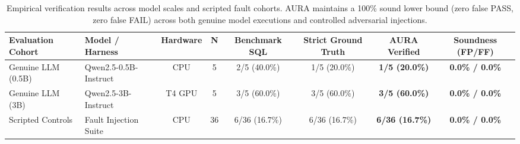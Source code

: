 \begin{table}[t]
\centering
\small
\begin{tabular}{llcccccc}
\toprule
\textbf{Evaluation Cohort} & \textbf{Model / Harness} & \textbf{Hardware} & \textbf{N} & \textbf{Benchmark SQL} & \textbf{Strict Ground Truth} & \textbf{AURA Verified} & \textbf{Soundness (FP/FF)} \\
\midrule
Genuine LLM (0.5B) & Qwen2.5-0.5B-Instruct & CPU & 5 & 2/5 (40.0\%) & 1/5 (20.0\%) & \textbf{1/5 (20.0\%)} & \textbf{0.0\% / 0.0\%} \\
Genuine LLM (3B)   & Qwen2.5-3B-Instruct   & T4 GPU & 5 & 3/5 (60.0\%) & 3/5 (60.0\%) & \textbf{3/5 (60.0\%)} & \textbf{0.0\% / 0.0\%} \\
Scripted Controls  & Fault Injection Suite & CPU & 36 & 6/36 (16.7\%) & 6/36 (16.7\%) & \textbf{6/36 (16.7\%)} & \textbf{0.0\% / 0.0\%} \\
\bottomrule
\end{tabular}
\caption{Empirical verification results across model scales and scripted fault cohorts. AURA maintains a 100\% sound lower bound (zero false PASS, zero false FAIL) across both genuine model executions and controlled adversarial injections.}
\label{tab:main_benchmark}
\end{table}
